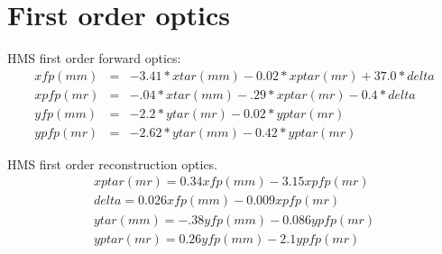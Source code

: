 \documentclass[]{article}
\begin{document}
	\section{First order optics}
	HMS first order forward optics:
\begin{eqnarray}
	xfp (mm) &=& -3.41*xtar (mm) - 0.02*xptar (mr) +37.0*delta \\
	xpfp (mr) &=& -.04*xtar (mm) - .29*xptar (mr) - 0.4*delta \\
	yfp (mm) &=& -2.2*ytar (mr) - 0.02*yptar (mr)  \\
	ypfp (mr) &=& -2.62*ytar (mm) - 0.42*yptar (mr) 
\end{eqnarray}
	
	HMS first order reconstruction optics.
\begin{eqnarray}
	xptar (mr) = 0.34 xfp ( mm) - 3.15 xpfp (mr) \\
	delta   = 0.026 xfp  (mm)  - 0.009 xpfp (mr) \\
	ytar  (mm) = -.38 yfp (mm) - 0.086ypfp (mr) \\
	yptar  (mr)= 0.26 yfp (mm) - 2.1 ypfp (mr) 
\end{eqnarray}
\end{document}
